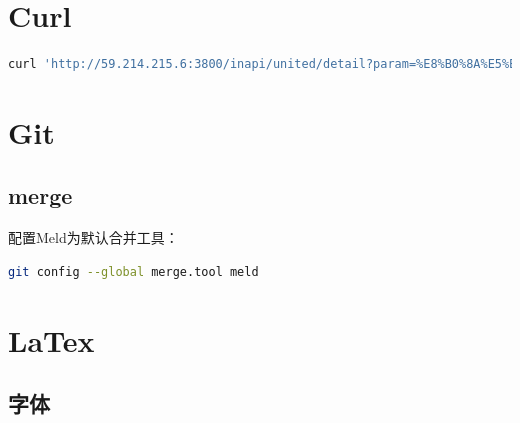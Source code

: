 \documentclass[letter]{book}
\begin{document}
\section{Curl}

\begin{lstlisting}[language=Bash]
curl 'http://59.214.215.6:3800/inapi/united/detail?param=%E8%B0%8A%E5%BE%B7%E5%AE%9E%E4%B8%9A&reds=&blacks=TS_F_HEIMINGDAN_C500033,TS_F_HEIMINGDAN' -H 'Pragma: no-cache' -H 'HL-APP-KEY: CreditChongqingSharePortal' -H 'DNT: 1' -H 'Accept-Encoding: gzip, deflate, sdch' -H 'Accept-Language: zh-CN,zh;q=0.8,en;q=0.6,zh-TW;q=0.4' -H 'User-Agent: Mozilla/5.0 (X11; Fedora; Linux x86_64) AppleWebKit/537.36 (KHTML, like Gecko) Chrome/55.0.2883.87 Safari/537.36' -H 'Accept: application/json, text/plain, */*' -H 'Cache-Control: no-cache' -H 'HL-CURRENT-URL: http://59.214.215.6:3800/main/search/unitedListQuery' -H 'Referer: http://59.214.215.6:3800/main/search/unitedListQuery' -H 'Cookie: UM_distinctid=15b667c97f65a-0afddd1bed9cb8-1421150f-15f900-15b667c97f737f; CNZZDATA1257579122=576897936-1492070602-http%253A%252F%252F59.214.215.6%253A8081%252F%7C1492393083; cc-o-t=ZnNoeEpnMXZUcklpRXAyTm9ReXhwWTdNSFFUMnptZ2NOdmFDWlhPajhlakRvYVk1eEtRem53enJMNVpzdU5HRURlejlRT3lqQ2VldHJUb2dETXZOVkIrcTZqZzR5M0xoUHZsL0V2TXZ1c3VYaVJkRE1NdEE5c0ZWMXI5dUVlV0g' -H 'Connection: keep-alive' --compressed
\end{lstlisting}

\section{Git}

\subsection{merge}

配置Meld为默认合并工具：

\begin{lstlisting}[language=Bash]
git config --global merge.tool meld
\end{lstlisting}



\section{LaTex}

\subsection{字体}
\end{document}
